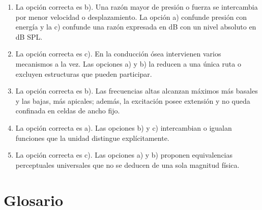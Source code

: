 \begin{enumerate}[label=\textbf{D\arabic*.},leftmargin=*]
    \item La opción correcta es b). Una razón mayor de presión o fuerza se
    intercambia por menor velocidad o desplazamiento. La opción a) confunde
    presión con energía y la c) confunde una razón expresada en dB con un
    nivel absoluto en dB SPL.

    \item La opción correcta es c). En la conducción ósea intervienen varios
    mecanismos a la vez. Las opciones a) y b) la reducen a una única ruta o
    excluyen estructuras que pueden participar.

    \item La opción correcta es b). Las frecuencias altas alcanzan máximos más
    basales y las bajas, más apicales; además, la excitación posee extensión y
    no queda confinada en celdas de ancho fijo.

    \item La opción correcta es a). Las opciones b) y c) intercambian o
    igualan funciones que la unidad distingue explícitamente.

    \item La opción correcta es c). Las opciones a) y b) proponen
    equivalencias perceptuales universales que no se deducen de una sola
    magnitud física.
\end{enumerate}

\section{Glosario}
\label{sec:u6-glosario}

